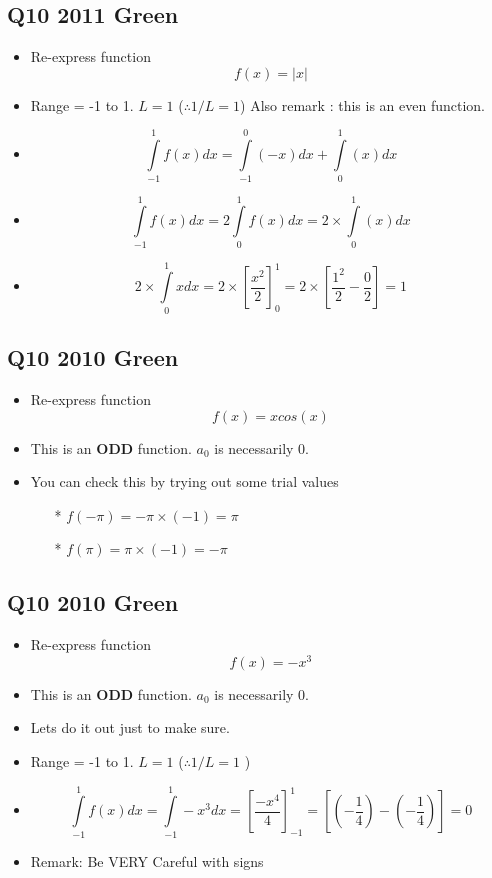 \documentclass[11pt,a4paper,titlepage,oneside,openany]{article}
\numberwithin{equation}{section}
\numberwithin{algorithm}{section}
\numberwithin{figure}{section}
\numberwithin{table}{section}
\begin{document}
\subsection*{Q10 2011 Green} 
\Large{
\begin{itemize}
\item Re-express function \[f(x) = |x|  \]
\item Range = -1 to 1. $L=1$ ($\therefore 1/L = 1$) Also remark : this is an even function.
\item \[\int\limits^{1}_{-1} f(x) dx = \int\limits^{0}_{-1} (-x) dx + \int\limits^{1}_{0} (x) dx \]
\item \[\int\limits^{1}_{-1} f(x) dx = 2\int\limits^{1}_{0} f(x) dx = 2 \times \int\limits^{1}_{0} (x) dx \]

\item \[ 2 \times \int\limits^{1}_{0} x dx = 2 \times \left[ \frac{x^2}{2} \right]^{1}_{0} = 
2 \times \left[ \frac{1^2}{2} - \frac{0}{2} \right]  = 1 \] 
\end{itemize}
}

\subsection*{Q10 2010 Green}
\Large{
\begin{itemize}
\item Re-express function \[f(x) = xcos(x)  \]
\item This is an \textbf{ODD} function. $a_0$ is necessarily 0.
\item You can check this by trying out some trial values
\begin{itemize}
\item[*] $f(-\pi) = -\pi \times (-1) = \pi$
\item[*] $f(\pi) = \pi \times (-1) = -\pi$
\end{itemize}
\end{itemize}
}


\subsection*{Q10 2010 Green}
\Large{
\begin{itemize}
\item Re-express function \[f(x) = -x^3  \]
\item This is an \textbf{ODD} function. $a_0$ is necessarily 0.
\item Lets do it out just to make sure.
\item Range = -1 to 1. $L=1$ ($\therefore 1/L = 1$ )
\item \[\int\limits^{1}_{-1} f(x) dx =\int\limits^{1}_{-1}-x^3 dx = \left[\frac{-x^4}{4} \right]^{1}_{-1}  = \left[\left(- \frac{1}{4} \right) - \left(- \frac{1}{4} \right) \right]  = 0\]
\item Remark: Be VERY Careful with signs
\end{itemize}
}
\end{document}
